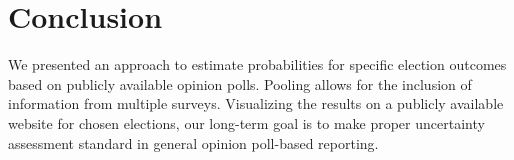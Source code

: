 \documentclass[twoside]{report}
\begin{document}
% 
% 
% 



\section{Conclusion}
We presented an approach to estimate probabilities for specific election outcomes based on publicly available opinion polls. Pooling allows for the inclusion of information from multiple surveys. Visualizing the results on a publicly available website for chosen elections, our long-term goal is to make proper uncertainty assessment standard in general opinion poll-based reporting.
\end{document}
